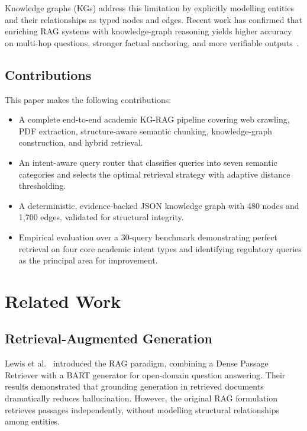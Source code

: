 \documentclass{ieeeaccess}
\begin{document}
Knowledge graphs (KGs) address this limitation by explicitly modelling entities and their relationships as typed nodes and edges. Recent work has confirmed that enriching RAG systems with knowledge-graph reasoning yields higher accuracy on multi-hop questions, stronger factual anchoring, and more verifiable outputs~\cite{b1,b6}.

\subsection{Contributions}
This paper makes the following contributions:
\begin{itemize}
    \item A complete end-to-end academic KG-RAG pipeline covering web crawling, PDF extraction, structure-aware semantic chunking, knowledge-graph construction, and hybrid retrieval.
    \item An intent-aware query router that classifies queries into seven semantic categories and selects the optimal retrieval strategy with adaptive distance thresholding.
    \item A deterministic, evidence-backed JSON knowledge graph with 480 nodes and 1,700 edges, validated for structural integrity.
    \item Empirical evaluation over a 30-query benchmark demonstrating perfect retrieval on four core academic intent types and identifying regulatory queries as the principal area for improvement.
\end{itemize}

\section{Related Work}
\label{sec:related}

\subsection{Retrieval-Augmented Generation}
Lewis et al.~\cite{b3} introduced the RAG paradigm, combining a Dense Passage Retriever with a BART generator for open-domain question answering. Their results demonstrated that grounding generation in retrieved documents dramatically reduces hallucination. However, the original RAG formulation retrieves passages independently, without modelling structural relationships among entities.
\end{document}
